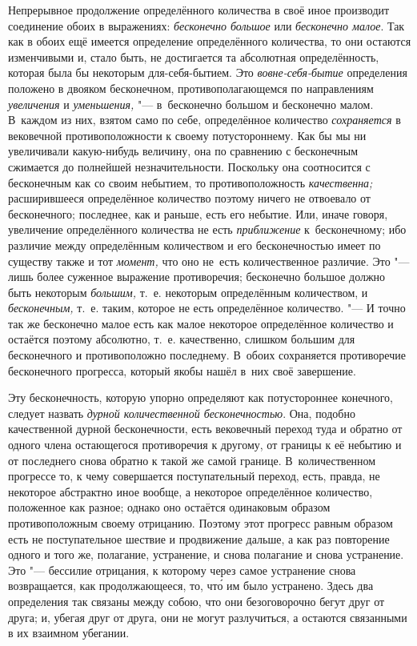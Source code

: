 Непрерывное продолжение определённого количества в своё иное производит
соединение обоих в выражениях: {\em бесконечно большое} или {\em бесконечно
малое}. Так как в обоих ещё имеется определение определённого количества, то
они остаются изменчивыми и, стало быть, не достигается та абсолютная
определённость, которая была бы некоторым для-себя-бытием. Это
{\em вовне-себя-бытие} определения положено в двояком бесконечном,
противополагающемся по направлениям {\em увеличения} и {\em уменьшения,} "---
в~бесконечно большом и бесконечно малом. В~каждом из них, взятом само по себе,
определённое количество {\em сохраняется} в вековечной противоположности к
своему потустороннему. Как бы мы ни увеличивали какую-нибудь величину, она по
сравнению с бесконечным сжимается до полнейшей незначительности. Поскольку она
соотносится с бесконечным как со своим небытием, то противоположность
{\em качественна;} расширившееся определённое количество поэтому ничего не
отвоевало от бесконечного; последнее, как и раньше, есть его небытие. Или,
иначе говоря, увеличение определённого количества не есть {\em приближение}
к~бесконечному; ибо различие между определённым количеством и его
бесконечностью имеет по существу также и тот {\em момент,} что оно не~есть
количественное различие. Это "--- лишь более суженное выражение противоречия;
бесконечно большое должно быть некоторым {\em большим,} т.~е. некоторым
определённым количеством, и {\em бесконечным,} т.~е. таким, которое не есть
определённое количество. "--- И точно так же бесконечно малое есть как малое
некоторое определённое количество и остаётся поэтому абсолютно, т.~е.
качественно, слишком большим для бесконечного и противоположно последнему.
В~обоих сохраняется противоречие бесконечного прогресса, который якобы нашёл
в~них своё завершение.

Эту бесконечность, которую упорно определяют как потустороннее конечного,
следует назвать {\em дурной количественной бесконечностью}. Она, подобно
качественной дурной бесконечности, есть вековечный переход туда и обратно от
одного члена остающегося противоречия к другому, от границы к её небытию и от
последнего снова обратно к такой же самой границе. В~количественном прогрессе
то, к чему совершается поступательный переход, есть, правда, не некоторое
абстрактно иное вообще, а некоторое определённое количество, положенное как
разное; однако оно остаётся одинаковым образом противоположным своему
отрицанию. Поэтому этот прогресс равным образом есть не поступательное шествие
и продвижение дальше, а как раз повторение одного и того же, полагание,
устранение, и снова полагание и снова устранение. Это "--- бессилие отрицания,
к которому через самое устранение снова возвращается, как продолжающееся, то,
чт\'{о} им было устранено. Здесь два определения так связаны между собою, что они
безоговорочно бегут друг от друга; и, убегая друг от друга, они не могут
разлучиться, а остаются связанными в их взаимном убегании.

